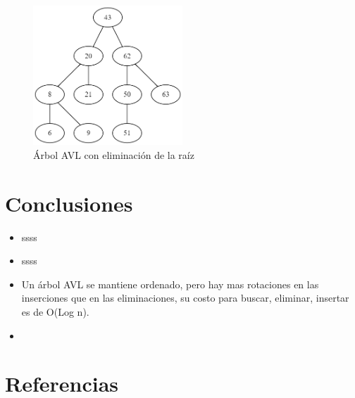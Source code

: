 \documentclass{article}
\begin{document}
             \begin{figure}[htbp]
              \centering
              \includegraphics[width=0.5\textwidth]{img/avltree-deletion-2.png}
              \caption{Árbol AVL con eliminación de la raíz}
              \label{fig:avldelete2}
            \end{figure}

    \section{Conclusiones}
        \begin{itemize}
                 \item  ssss
                 \item	ssss
                 \item Un árbol AVL se mantiene ordenado, pero hay mas rotaciones en las inserciones que en las eliminaciones, su costo para buscar, eliminar, insertar  es de O(Log n).
                 \item  
        \end{itemize}

    \section{Referencias}
  
\end{document}
